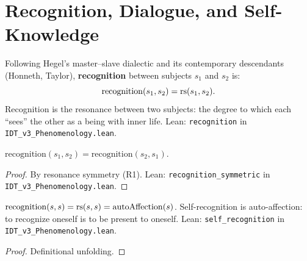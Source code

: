 \section{Recognition, Dialogue, and Self-Knowledge}

\begin{definition}[Recognition]
\label{def:recognition}
Following Hegel's master--slave dialectic and its contemporary descendants
(Honneth, Taylor), \textbf{recognition} between subjects $s_1$ and $s_2$ is:
\[
\mathrm{recognition}(s_1, s_2) = \mathrm{rs}(s_1, s_2).
\]
Recognition is the resonance between two subjects: the degree to which
each ``sees'' the other as a being with inner life.
Lean: \texttt{recognition} in \texttt{IDT\_v3\_Phenomenology.lean}.
\end{definition}

\begin{theorem}
\label{thm:recognition-symmetric}
$\mathrm{recognition}(s_1, s_2) = \mathrm{recognition}(s_2, s_1)$.
\end{theorem}

\begin{proof}
By resonance symmetry (R1).
Lean: \texttt{recognition\_symmetric} in \texttt{IDT\_v3\_Phenomenology.lean}.
\end{proof}

\begin{theorem}
\label{thm:self-recognition}
$\mathrm{recognition}(s, s) = \mathrm{rs}(s, s) = \mathrm{autoAffection}(s)$.
Self-recognition is auto-affection: to recognize oneself is to be present
to oneself.
Lean: \texttt{self\_recognition} in \texttt{IDT\_v3\_Phenomenology.lean}.
\end{theorem}

\begin{proof}
Definitional unfolding.
\end{proof}

